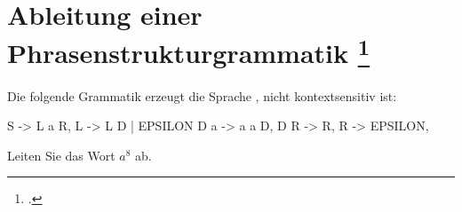 \documentclass{lehramt-informatik-aufgabe}
\begin{document}
\section{Ableitung einer Phrasenstrukturgrammatik
\footcite[Seite 15-16]{thoe:fs:3}}

Die folgende Grammatik erzeugt die Sprache , nicht kontextsensitiv ist:

\begin{liProduktionsRegeln}
S -> L a R,
L -> L D | EPSILON
D a -> a a D,
D R -> R,
R -> EPSILON,
\end{liProduktionsRegeln}

Leiten Sie das Wort $a^8$ ab.

\begin{liAntwort}
\end{liAntwort}
\end{document}
